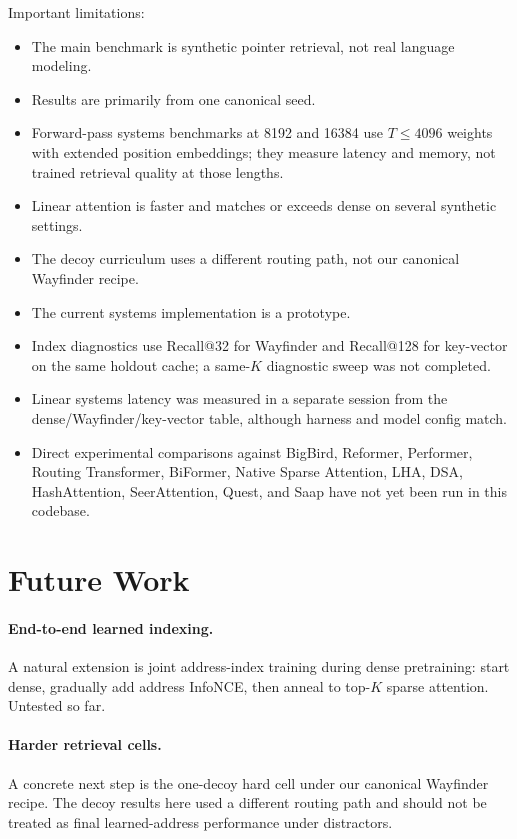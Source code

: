 \documentclass{article}
\begin{document}
Important limitations:
\begin{itemize}
    \item The main benchmark is synthetic pointer retrieval, not real language modeling.
    \item Results are primarily from one canonical seed.
    \item Forward-pass systems benchmarks at 8192 and 16384 use $T \le 4096$ weights with extended position embeddings; they measure latency and memory, not trained retrieval quality at those lengths.
    \item Linear attention is faster and matches or exceeds dense on several synthetic settings.
    \item The decoy curriculum uses a different routing path, not our canonical Wayfinder recipe.
    \item The current systems implementation is a prototype.
    \item Index diagnostics use Recall@32 for Wayfinder and Recall@128 for key-vector on the same holdout cache; a same-$K$ diagnostic sweep was not completed.
    \item Linear systems latency was measured in a separate session from the dense/Wayfinder/key-vector table, although harness and model config match.
    \item Direct experimental comparisons against BigBird, Reformer, Performer, Routing Transformer, BiFormer, Native Sparse Attention, LHA, DSA, HashAttention, SeerAttention, Quest, and Saap have not yet been run in this codebase.
\end{itemize}

\section{Future Work}

\paragraph{End-to-end learned indexing.}
A natural extension is joint address-index training during dense pretraining: start dense, gradually add address InfoNCE, then anneal to top-$K$ sparse attention. Untested so far.

\paragraph{Harder retrieval cells.}
A concrete next step is the one-decoy hard cell under our canonical Wayfinder recipe. The decoy results here used a different routing path and should not be treated as final learned-address performance under distractors.
\end{document}
